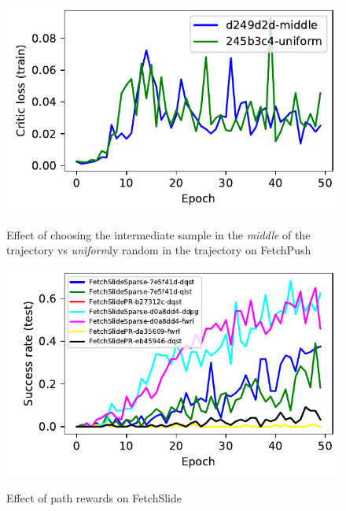 \begin{figure}
  \includegraphics[width=\frac\columnwidth]{media/res/d249d2d-c9bfa98b-FetchPush-v1-fwrl-future/train/critic_loss.pdf}%
  \label{fig:middle-vs-uniform}%
  \caption{Effect of choosing the intermediate sample in the \emph{middle} of the
    trajectory vs \emph{uniform}ly random in the trajectory on FetchPush}%
\end{figure}%
% 

%
\begin{figure}%
  \includegraphics[width=\columnwidth]{./media/res/eb45946-path_reward-FetchSlidePR-v1-dqst/test/success_rate.pdf}%
  \label{fig:}%
  \caption{Effect of path rewards on FetchSlide}%
\end{figure}%
% 

